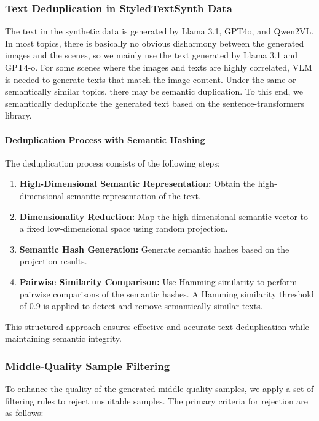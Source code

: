 \subsubsection{Text Deduplication in StyledTextSynth Data}
The text in the synthetic data is generated by Llama 3.1, GPT4o, and Qwen2VL. 
In most topics, there is basically no obvious disharmony between the generated images and the scenes, so we mainly use the text generated by Llama 3.1 and GPT4-o. 
For some scenes where the images and texts are highly correlated, VLM is needed to generate texts that match the image content.
Under the same or semantically similar topics, there may be semantic duplication. To this end, we semantically deduplicate the generated text based on the sentence-transformers library. 

\paragraph{Deduplication Process with Semantic Hashing}
The deduplication process consists of the following steps:
\begin{enumerate}
    \item \textbf{High-Dimensional Semantic Representation:} 
    Obtain the high-dimensional semantic representation of the text.

    \item \textbf{Dimensionality Reduction:}
    Map the high-dimensional semantic vector to a fixed low-dimensional space using random projection.

    \item \textbf{Semantic Hash Generation:}
    Generate semantic hashes based on the projection results.

    \item \textbf{Pairwise Similarity Comparison:}
    Use Hamming similarity to perform pairwise comparisons of the semantic hashes. A Hamming similarity threshold of 0.9 is applied to detect and remove semantically similar texts.

\end{enumerate}

This structured approach ensures effective and accurate text deduplication while maintaining semantic integrity.


\subsubsection{Middle-Quality Sample Filtering}

To enhance the quality of the generated middle-quality samples, we apply a set of filtering rules to reject unsuitable samples. The primary criteria for rejection are as follows:

